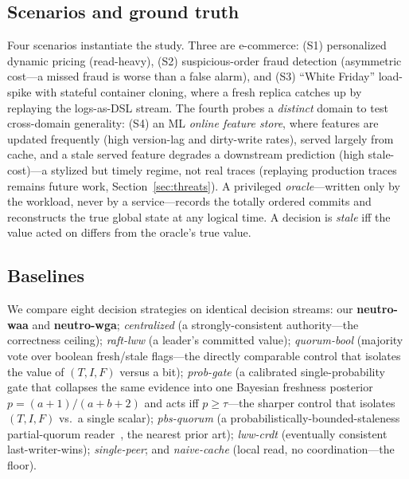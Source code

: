 \documentclass[11pt]{article}
\begin{document}
\subsection{Scenarios and ground truth}
Four scenarios instantiate the study. Three are e-commerce: (S1) personalized dynamic pricing
(read-heavy), (S2) suspicious-order fraud detection (asymmetric cost---a missed fraud is worse than a
false alarm), and (S3) ``White Friday'' load-spike with stateful container cloning, where a fresh replica
catches up by replaying the logs-as-DSL stream. The fourth probes a \emph{distinct} domain to test
cross-domain generality: (S4) an ML \emph{online feature store}, where features are updated frequently
(high version-lag and dirty-write rates), served largely from cache, and a stale served feature degrades
a downstream prediction (high stale-cost)---a stylized but timely regime, not real traces (replaying
production traces remains future work, Section~\ref{sec:threats}). A privileged \emph{oracle}---written
only by the workload, never by
a service---records the totally ordered commits and reconstructs the true global state at any logical
time. A decision is \emph{stale} iff the value acted on differs from the oracle's true value.

\subsection{Baselines}
We compare eight decision strategies on identical decision streams: our \textbf{neutro-waa} and
\textbf{neutro-wga}; \emph{centralized} (a strongly-consistent authority---the correctness ceiling);
\emph{raft-lww} (a leader's committed value); \emph{quorum-bool} (majority vote over boolean
fresh/stale flags---the directly comparable control that isolates the value of $(T,I,F)$ versus a bit);
\emph{prob-gate} (a calibrated single-probability gate that collapses the same evidence into one
Bayesian freshness posterior $p=(a{+}1)/(a{+}b{+}2)$ and acts iff $p\ge\tau$---the sharper control that
isolates $(T,I,F)$ vs.\ a single scalar); \emph{pbs-quorum} (a probabilistically-bounded-staleness
partial-quorum reader~\cite{bailis2012pbs}, the nearest prior art); \emph{lww-crdt} (eventually
consistent last-writer-wins); \emph{single-peer}; and \emph{naive-cache} (local read, no
coordination---the floor).
\end{document}
